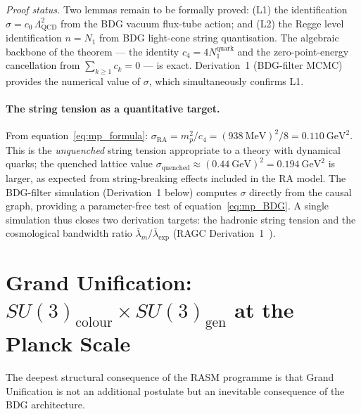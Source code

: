 \documentclass[11pt,a4paper]{article}
\begin{document}
\emph{Proof status.} Two lemmas remain to be formally proved: (L1) the
identification $\sigma = c_0\,\Lambda_{\mathrm{QCD}}^2$ from the BDG vacuum
flux-tube action; and (L2) the Regge level identification $n = N_1$ from
BDG light-cone string quantisation. The algebraic backbone of the theorem
--- the identity $c_4 = 4N_1^{\mathrm{quark}}$ and the zero-point-energy
cancellation from $\sum_{k\ge 1}c_k = 0$ --- is exact.  Derivation~1
(BDG-filter MCMC) provides the numerical value of $\sigma$, which
simultaneously confirms L1.

\paragraph{The string tension as a quantitative target.}
From equation~\eqref{eq:mp_formula}: $\sigma_{\mathrm{RA}} = m_p^2/c_4
= (938~\mathrm{MeV})^2/8 = 0.110~\mathrm{GeV}^2$.  This is the
\emph{unquenched} string tension appropriate to a theory with dynamical
quarks; the quenched lattice value $\sigma_{\mathrm{quenched}}\approx
(0.44~\mathrm{GeV})^2 = 0.194~\mathrm{GeV}^2$ is larger, as expected
from string-breaking effects included in the RA model.  The BDG-filter
simulation (Derivation~1 below) computes $\sigma$ directly from the
causal graph, providing a parameter-free test of equation~\eqref{eq:mp_BDG}.
A single simulation thus closes two derivation targets: the hadronic
string tension and the cosmological bandwidth ratio
$\bar\lambda_m/\bar\lambda_{\mathrm{exp}}$ (RAGC Derivation~1~\citep{Sandeman2026RAGC}).

\section{Grand Unification: $SU(3)_{\mathrm{colour}} \times SU(3)_{\mathrm{gen}}$
at the Planck Scale}
\label{sec:gut}

The deepest structural consequence of the RASM programme is that Grand
Unification is not an additional postulate but an inevitable consequence
of the BDG architecture.
\end{document}
